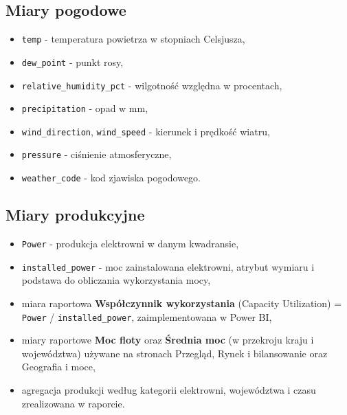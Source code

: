 \documentclass[12pt]{article}
\begin{document}
	\subsection{Miary pogodowe}
	\begin{itemize}
		\item \texttt{temp} - temperatura powietrza w stopniach Celsjusza,
		\item \texttt{dew\_point} - punkt rosy,
		\item \texttt{relative\_humidity\_pct} - wilgotność względna w procentach,
		\item \texttt{precipitation} - opad w mm,
		\item \texttt{wind\_direction}, \texttt{wind\_speed} - kierunek i prędkość wiatru,
		\item \texttt{pressure} - ciśnienie atmosferyczne,
		\item \texttt{weather\_code} - kod zjawiska pogodowego.
	\end{itemize}

	\subsection{Miary produkcyjne}
	\begin{itemize}
		\item \texttt{Power} - produkcja elektrowni w danym kwadransie,
		\item \texttt{installed\_power} - moc zainstalowana elektrowni, atrybut wymiaru i podstawa do obliczania wykorzystania mocy,
		\item miara raportowa \textbf{Współczynnik wykorzystania} (Capacity Utilization) = \texttt{Power} / \texttt{installed\_power}, zaimplementowana w Power BI,
		\item miary raportowe \textbf{Moc floty} oraz \textbf{Średnia moc} (w przekroju kraju i województwa) używane na stronach Przegląd, Rynek i bilansowanie oraz Geografia i moce,
		\item agregacja produkcji według kategorii elektrowni, województwa i czasu zrealizowana w raporcie.
	\end{itemize}
\end{document}
